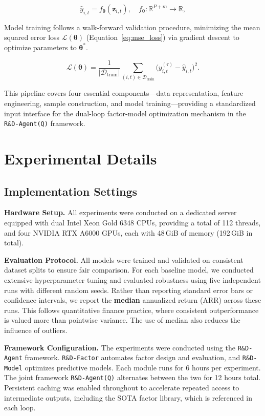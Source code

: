 \documentclass{article}
\newcommand{\name}{\texttt{R\&D-Agent(Q)}}
\begin{document}
\begin{equation}
\hat{y}_{i,t}=f_{\boldsymbol{\theta}}\left(\mathbf{z}_{i,t}\right),\quad f_{\boldsymbol{\theta}}:\mathbb{R}^{P+m}\rightarrow\mathbb{R},
\label{eq:predictor}
\end{equation}

Model training follows a walk-forward validation procedure, minimizing the mean squared error loss $\mathcal{L}(\boldsymbol{\theta})$ (Equation~\eqref{eq:mse_loss}) via gradient descent to optimize parameters to $\boldsymbol{\theta}^{\ast}$.

\begin{equation}
\mathcal{L}(\boldsymbol{\theta})=\frac{1}{|\mathcal{D}_{\mathrm{train}}|}\!
\sum_{(i,t)\in\mathcal{D}_{\mathrm{train}}}\!\bigl(y_{i,t}^{(\tau)}-\hat{y}_{i,t}\bigr)^{2}.
\label{eq:mse_loss}
\end{equation}

This pipeline covers four essential components—data representation, feature engineering, sample construction, and model training—providing a standardized input interface for the dual-loop factor-model optimization mechanism in the \texttt{\name} framework.

\section{Experimental Details} \label{app:exp_details}
\subsection{Implementation Settings} \label{app:impl_settings}
\textbf{Hardware Setup.}
All experiments were conducted on a dedicated server equipped with dual Intel Xeon Gold 6348 CPUs, providing a total of 112 threads, and four NVIDIA RTX A6000 GPUs, each with 48\,GiB of memory (192\,GiB in total). 

\textbf{Evaluation Protocol.}
All models were trained and validated on consistent dataset splits to ensure fair comparison.
For each baseline model, we conducted extensive hyperparameter tuning and evaluated robustness using five independent runs with different random seeds. Rather than reporting standard error bars or confidence intervals, we report the \textbf{median} annualized return (ARR) across these runs. This follows quantitative finance practice, where consistent outperformance is valued more than pointwise variance. The use of median also reduces the influence of outliers.

\textbf{Framework Configuration.}
The experiments were conducted using the \texttt{R\&D-Agent} framework. \texttt{R\&D-Factor} automates factor design and evaluation, and \texttt{R\&D-Model} optimizes predictive models. Each module runs for 6 hours per experiment. The joint framework \texttt{\name} alternates between the two for 12 hours total. Persistent caching was enabled throughout to accelerate repeated access to intermediate outputs, including the SOTA factor library, which is referenced in each loop.
\end{document}
